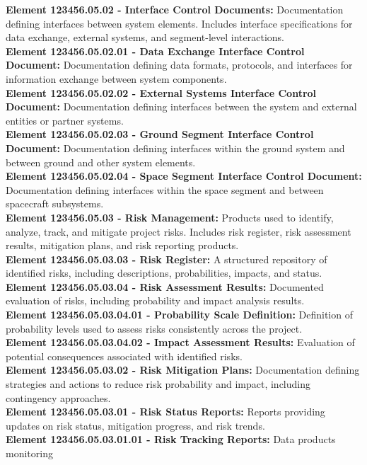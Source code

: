 \textbf{Element 123456.05.02 - Interface Control Documents:} Documentation defining
interfaces between system elements. Includes interface specifications for data
exchange, external systems, and segment-level interactions.\\
\textbf{Element 123456.05.02.01 - Data Exchange Interface Control Document:}
Documentation defining data formats, protocols, and interfaces for information
exchange between system components.\\
\textbf{Element 123456.05.02.02 - External Systems Interface Control Document:}
Documentation defining interfaces between the system and external entities or
partner systems.\\
\textbf{Element 123456.05.02.03 - Ground Segment Interface Control Document:}
Documentation defining interfaces within the ground system and between ground
and other system elements.\\
\textbf{Element 123456.05.02.04 - Space Segment Interface Control Document:}
Documentation defining interfaces within the space segment and between spacecraft
subsystems.\\
\textbf{Element 123456.05.03 - Risk Management:} Products used to identify, analyze,
track, and mitigate project risks. Includes risk register, risk assessment results,
mitigation plans, and risk reporting products.\\
\textbf{Element 123456.05.03.03 - Risk Register:} A structured repository of identified risks,
including descriptions, probabilities, impacts, and status.\\
\textbf{Element 123456.05.03.04 - Risk Assessment Results:} Documented evaluation of
risks, including probability and impact analysis results.\\
\textbf{Element 123456.05.03.04.01 - Probability Scale Definition:} Definition of probability
levels used to assess risks consistently across the project.\\
\textbf{Element 123456.05.03.04.02 - Impact Assessment Results:} Evaluation of potential
consequences associated with identified risks.\\
\textbf{Element 123456.05.03.02 - Risk Mitigation Plans:} Documentation defining strategies
and actions to reduce risk probability and impact, including contingency approaches.\\
\textbf{Element 123456.05.03.01 - Risk Status Reports:} Reports providing updates on risk
status, mitigation progress, and risk trends.\\
\textbf{Element 123456.05.03.01.01 - Risk Tracking Reports:} Data products monitoring
